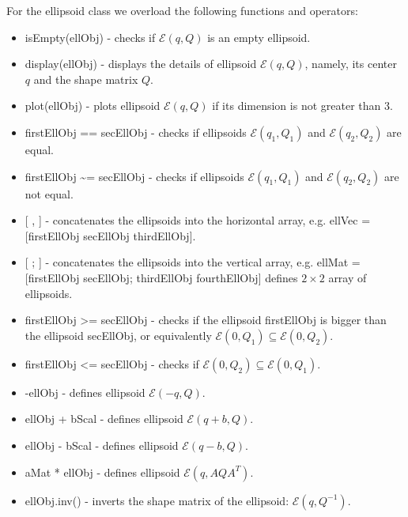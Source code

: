 \documentclass[letterpaper,10pt,english]{sphinxmanual}
\begin{document}
For the ellipsoid class we overload the following functions and
operators:
\begin{itemize}
\item {} 
isEmpty(ellObj) - checks if \({\mathcal E}(q,Q)\) is an empty
ellipsoid.

\item {} 
display(ellObj) - displays the details of ellipsoid
\({\mathcal E}(q,Q)\), namely, its center \(q\) and the shape
matrix \(Q\).

\item {} 
plot(ellObj) - plots ellipsoid \({\mathcal E}(q,Q)\) if its
dimension is not greater than 3.

\item {} 
firstEllObj == secEllObj - checks if ellipsoids
\({\mathcal E}(q_1,Q_1)\) and \({\mathcal E}(q_2,Q_2)\) are
equal.

\item {} 
firstEllObj \textasciitilde{}= secEllObj - checks if ellipsoids
\({\mathcal E}(q_1,Q_1)\) and \({\mathcal E}(q_2,Q_2)\) are
not equal.

\item {} 
{[} , {]} - concatenates the ellipsoids into the horizontal array, e.g. ellVec
= {[}firstEllObj secEllObj thirdEllObj{]}.

\item {} 
{[} ; {]} - concatenates the ellipsoids into the vertical array, e.g. ellMat =
{[}firstEllObj secEllObj; thirdEllObj fourthEllObj{]} defines
\(2\times 2\) array of ellipsoids.

\item {} 
firstEllObj \textgreater{}= secEllObj - checks if the ellipsoid firstEllObj is
bigger than the ellipsoid secEllObj, or equivalently
\({\mathcal E}(0,Q_1)\subseteq{\mathcal E}(0,Q_2)\).

\item {} 
firstEllObj \textless{}= secEllObj - checks if
\({\mathcal E}(0,Q_2)\subseteq{\mathcal E}(0,Q_1)\).

\item {} 
-ellObj - defines ellipsoid \({\mathcal E}(-q,Q)\).

\item {} 
ellObj + bScal - defines ellipsoid \({\mathcal E}(q+b,Q)\).

\item {} 
ellObj - bScal - defines ellipsoid \({\mathcal E}(q-b,Q)\).

\item {} 
aMat * ellObj - defines ellipsoid \({\mathcal E}(q,AQA^T)\).

\item {} 
ellObj.inv() - inverts the shape matrix of the ellipsoid:
\({\mathcal E}(q,Q^{-1})\).

\end{itemize}
\end{document}
